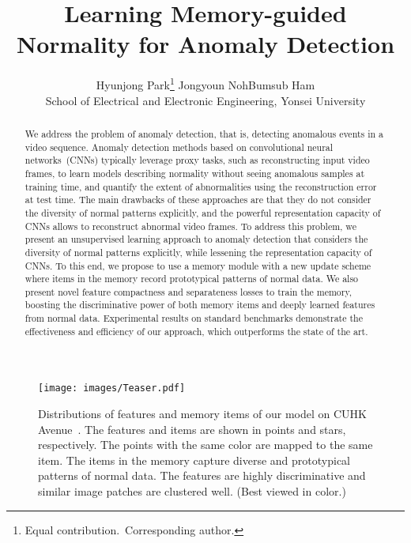 \documentclass[10pt,twocolumn,letterpaper]{article}
\begin{document}
	
\title{Learning Memory-guided Normality for Anomaly Detection}

\author{Hyunjong Park\thanks{Equal contribution.~Corresponding author.} \quad\quad\quad Jongyoun Noh\footnotemark[1] \quad\quad\quad Bumsub Ham\textsuperscript{}\vspace*{0.1cm}\\
School of Electrical and Electronic Engineering, Yonsei University\\
}

\maketitle
\thispagestyle{empty}

\begin{abstract}
\vspace{-0.3cm}
We address the problem of anomaly detection, that is, detecting anomalous events in a video sequence. Anomaly detection methods based on convolutional neural networks~(CNNs) typically leverage proxy tasks, such as reconstructing input video frames, to learn models describing normality without seeing anomalous samples at training time, and quantify the extent of abnormalities using the reconstruction error at test time. The main drawbacks of these approaches are that they do not consider the diversity of normal patterns explicitly, and the powerful representation capacity of CNNs allows to reconstruct abnormal video frames. To address this problem, we present an unsupervised learning approach to anomaly detection that considers the diversity of normal patterns explicitly, while lessening the representation capacity of CNNs. To this end, we propose to use a memory module with a new update scheme where items in the memory record prototypical patterns of normal data. We also present novel feature compactness and separateness losses to train the memory, boosting the discriminative power of both memory items and deeply learned features from normal data. Experimental results on standard benchmarks demonstrate the effectiveness and efficiency of our approach, which outperforms the state of the art.

\end{abstract}

	
\begin{figure}[t]
		\centering
		\texttt{[image: images/Teaser.pdf]}
\vspace{-0.1cm}
		\caption{Distributions of features and memory items of our model on CUHK Avenue~\cite{lu2013abnormal}. The features and items are shown in points and stars, respectively. The points with the same color are mapped to the same item. The items in the memory capture diverse and prototypical patterns of normal data. The features are highly discriminative and similar image patches are clustered well. (Best viewed in color.)}
		\vspace{-0.3cm}
		\label{fig:teaser}
    \end{figure}
\end{document}
